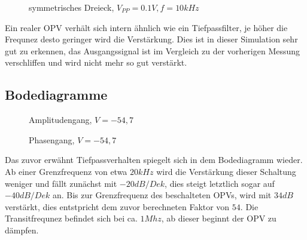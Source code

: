 \begin{figure}[H]
  \centering
  \caption{symmetrisches Dreieck, $V_{PP}=0.1V, f=10kHz$}
\end{figure}
\noindent
Ein realer OPV verh\"alt sich intern \"ahnlich wie ein Tiefpassfilter, je h\"oher die Frequnez desto geringer wird die Verst\"arkung. Dies ist in dieser Simulation sehr gut zu
erkennen, das Ausgangssignal ist im Vergleich zu der vorherigen Messung verschliffen und wird nicht mehr so gut verst\"arkt.


\subsection{Bodediagramme}
\begin{figure}[H]
  \centering
  \caption{Amplitudengang, $V=-54,7$}
\end{figure}
\begin{figure}[H]
  \centering
  \caption{Phasengang, $V=-54,7$}
\end{figure}
\noindent
Das zuvor erw\"ahnt Tiefpassverhalten spiegelt sich in dem Bodediagramm wieder. Ab einer Grenzfrequenz von etwa $20kHz$ wird die Verst\"arkung dieser Schaltung weniger und f\"allt zun\"achst mit $-20dB/Dek$, dies steigt letztlich sogar auf $-40dB/Dek$ an. Bis zur Grenzfrequenz des beschalteten OPVs, wird mit $34dB$ verst\"arkt, dies entstpricht dem zuvor berechneten Faktor von $54$. Die Transitfrequnez befindet sich bei ca. $1Mhz$, ab dieser beginnt der OPV zu d\"ampfen.

